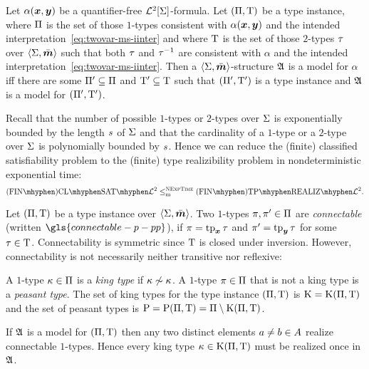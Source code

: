 \begin{remark}\label{rem:red-sat-to-real}
Let $\alpha(\bm{x},\bm{y})$ be a quantifier-free $\mathcal{L}^{2}[\mathrm{\Sigma}]$-formula.
Let $(\Pi,\mathrm{T})$ be a type instance, where $\Pi$ is the set of those
$1$-types consistent with $\alpha(\bm{x},\bm{y})$ and the intended
interpretation~\cref{eq:twovar-ms-iinter} and where $\mathrm{T}$ is the set of
those $2$-types $\tau$ over $\left\langle \mathrm{\Sigma},\bar{\bm{m}} \right\rangle$ such that both $\tau$ and 
$\tau^{-1}$ are consistent with $\alpha$ and the intended interpretation~\cref{eq:twovar-ms-iinter}. Then a $\left\langle \mathrm{\Sigma},\bar{\bm{m}} \right\rangle$-structure
$\mathfrak{A}$ is a model for $\alpha$ iff there are some ${\Pi'} \subseteq \Pi$ and
${\mathrm{T}'} \subseteq \mathrm{T}$ such that $({\Pi'},{\mathrm{T}'})$ is a type instance and
$\mathfrak{A}$ is a model for $({\Pi'},{\mathrm{T}'})$.

Recall that the number of possible $1$-types or $2$-types over $\mathrm{\Sigma}$ is
exponentially bounded by the length $s$ of $\mathrm{\Sigma}$ and that the cardinality
of a $1$-type or a $2$-type over $\mathrm{\Sigma}$ is polynomially bounded by $s$.
Hence we can reduce the (finite) classified satisfiability problem to the
(finite) type realizibility problem in nondeterministic exponential time:
\[
  \FinAClSat{\vFo2} \red\cNExpTime \FinAReal{\vFo2}.
\]
\end{remark}

\begin{definition}\label{def:connectable}
Let $(\Pi,\mathrm{T})$ be a type instance over $\left\langle \mathrm{\Sigma},\bar{\bm{m}} \right\rangle$.
Two $1$-types $\pi, {\pi'} \in \Pi$ are \emph{connectable} 
(written $\gls{connectable-p-pp}$), 
if $\pi = \operatorname{tp}_{\bm{x}}\tau$ and ${\pi'} = \operatorname{tp}_{\bm{y}}\tau$ for some $\tau \in \mathrm{T}$.
Connectability is symmetric since $\mathrm{T}$ is closed under inversion.
However, connectability is not necessarily neither transitive nor reflexive:

A $1$-type $\kappa \in \Pi$ is a \emph{king type} if $\kappa \not\sim \kappa$.
A $1$-type $\pi \in \Pi$ that is not a king type is a \emph{peasant type}.
The set of king types for the type instance $(\Pi,\mathrm{T})$ is
$\mathrm{K} = \mathrm{K}(\Pi,\mathrm{T})$ and the set of peasant types is
$\mathrm{P} = \mathrm{P}(\Pi,\mathrm{T}) = \Pi \setminus \mathrm{K}(\Pi,\mathrm{T})$.
\end{definition}
\begin{remark}\label{rem:twovar-king-once}
If $\mathfrak{A}$ is a model for $(\Pi,\mathrm{T})$ then any two distinct
elements $a \neq b \in A$ realize connectable $1$-types. Hence every king type
$\kappa \in \mathrm{K}(\Pi,\mathrm{T})$ must be realized once in $\mathfrak{A}$.
\end{remark}

